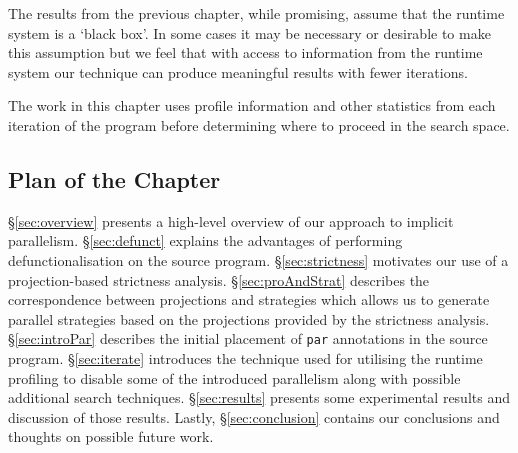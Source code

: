 The results from the previous chapter, while promising, assume that the runtime
system is a `black box'. In some cases it may be necessary or desirable to make
this assumption but we feel that with access to information from the runtime
system our technique can produce meaningful results with fewer iterations.

The work in this chapter uses profile information and other statistics from
each iteration of the program before determining where to proceed in the search
space.

\subsection{Plan of the Chapter}

\S\ref{sec:overview} presents a high-level overview of our approach to implicit
parallelism.  \S\ref{sec:defunct} explains the advantages of performing
defunctionalisation on the source program. \S\ref{sec:strictness} motivates our
use of a projection-based strictness analysis.  \S\ref{sec:proAndStrat}
describes the correspondence between projections and strategies which allows us
to generate parallel strategies based on the projections provided by the
strictness analysis. \S\ref{sec:introPar} describes the initial placement of
\verb-par- annotations in the source program. \S\ref{sec:iterate} introduces
the technique used for utilising the runtime profiling to disable some of the
introduced parallelism along with possible additional search techniques.
\S\ref{sec:results} presents some experimental results and discussion of those
results. Lastly, \S\ref{sec:conclusion} contains our conclusions and thoughts
on possible future work.
